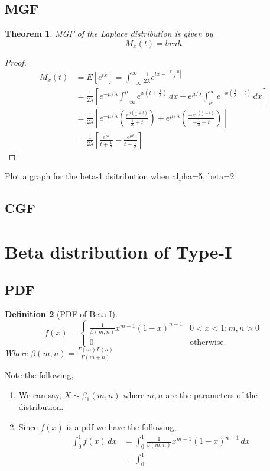 \documentclass[oneside,11pt,pdftex]{book}%
\numberwithin{equation}{section}
\newtheorem{theorem}{Theorem}[chapter]%
\newtheorem{definition}[theorem]{Definition}
\numberwithin{section}{chapter}
\numberwithin{equation}{chapter}
\begin{document}
\subsection{MGF}
\begin{theorem}
	MGF of the Laplace distribution is given by \[ M_x(t)=bruh \]
\end{theorem}
\begin{proof}
	\begin{align*}
		M_x(t)&=E[e^{tx}]=\int_{-\infty}^\infty \frac{1}{2\lambda} e^{tx-\left|\frac{x-\mu }{\lambda}\right|}\\
		&=\frac{1}{2\lambda}\left[e^{-\mu/\lambda} \int_{-\infty}^\mu e^{x\left(t+\frac{1}{\lambda} \right)}\, dx + e^{\mu/\lambda}\int_\mu^{\infty} e^{-x\left(\frac{1}{\lambda}-t \right)}\, dx\right]\\
		&= \frac{1}{2 \lambda } \left[e^{-\mu/\lambda} \left(\frac{e^{\mu \left( \frac{1}{\lambda} +t \right)}}{\frac{1}{\lambda}+t}\right) + e^{\mu/\lambda} \left(\frac{-e^{\mu \left(\frac{1}{\lambda}-t \right)}}{-\frac{1}{\lambda} +t}\right)\right]\\
		&=\frac{1}{2\lambda }\left[\frac{e^{\mu t}}{t+\frac{1}{\lambda}}-\frac{e^{\mu t}}{t-\frac{1}{\lambda}}\right]
	\end{align*}
\end{proof}

Plot a graph for the beta-1 dsitribution when alpha=5, beta=2
\subsection{CGF}

\section{Beta distribution of Type-I}
\subsection{PDF}
\begin{definition}[PDF of Beta I]
	\[ f(x)=\begin{cases}
		\frac{1}{\beta(m,n)}x^{m-1}(1-x)^{n-1} & 0<x<1; m,n>0\\
		0 & \text{otherwise}
	\end{cases} \]
	Where $ \beta(m,n) = \frac{\Gamma(m)\Gamma(n)}{\Gamma(m+n)}$
\end{definition}
Note the following,
\begin{enumerate}
	\item We can say, $ X \sim \beta_1 (m,n) $ where $ m,n $ are the parameters of the distribution.
	\item Since $ f(x) $ is a pdf we have the following,
	\begin{align*}
		\int_0^1 f(x)\, dx &= \int_0^1 \frac{1}{\beta(m,n)} x^{m-1} (1-x)^{n-1}\, dx\\
		&= \int_0^1 
	\end{align*}
\end{enumerate}
\end{document}
